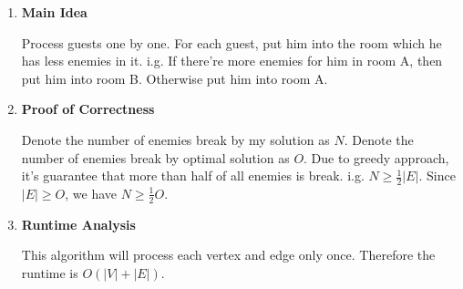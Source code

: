 \documentclass[11pt]{article}
\newenvironment{qparts}{\begin{enumerate}[{(}a{)}]}{\end{enumerate}}
\begin{document}
\begin{qparts}
	\item \textbf{Main Idea}

	Process guests one by one. For each guest, put him into the room which he has less enemies in it. i.g. If there're more enemies for him in room A, then put him into room B. Otherwise put him into room A.
	
	\item \textbf{Proof of Correctness}
	
	Denote the number of enemies break by my solution as $N$. Denote the number of enemies break by optimal solution as $O$. Due to greedy approach, it's guarantee that more than half of all enemies is break. i.g. $N \ge \frac{1}{2}|E|$. Since $|E| \ge O$, we have $N \ge \frac{1}{2} O $.
	

	\item \textbf{Runtime Analysis}
	
	This algorithm will process each vertex and edge only once. Therefore the runtime is $O(|V| + |E|)$.
	

\end{qparts}
\end{document}
